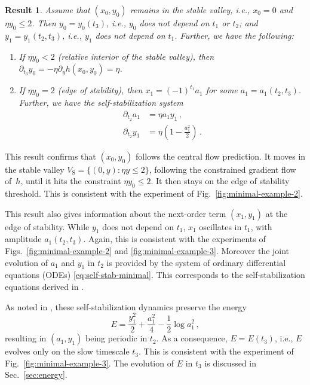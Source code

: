 \documentclass[11pt,english,reqno]{article}
\renewcommand{\leq}{\leqslant}
\theoremstyle{plain}
\newtheorem{result}[proposition]{Result}
\theoremstyle{definition}
\theoremstyle{remark}
\numberwithin{equation}{section}
\begin{document}
\begin{result}
    \label{result:minimal}
Assume that $(x_0, y_0)$ remains in the stable valley, i.e., $x_0 = 0$ and $\eta y_0 \leq 2$. Then $y_0 = y_0(t_3)$, i.e., $y_0$ does not depend on $t_1$ or $t_2$; and $y_1 = y_1(t_2, t_3)$, i.e., $y_1$ does not depend on $t_1$. Further, we have the following:
\begin{enumerate}[label=(\roman*)]
    \item\label{it:interior} If $\eta y_0 <2$ (relative interior of the stable valley), then $\partial_{t_3} y_0 = - \eta \partial_y h(x_0, y_0) = \eta$. 
    \item\label{it:eos} If $\eta y_0 = 2$ (edge of stability), then $x_1 = (-1)^{t_1}a_1$ for some $a_1 = a_1(t_2, t_3)$. Further, we have the self-stabilization system 
    \begin{equation}
        \label{eq:self-stab-minimal}
        \begin{split}
            \partial_{t_2} a_1 &= \eta a_1 y_1 \, , \\
            \partial_{t_2} y_1 &= \eta \left(1 - \frac{a_1^2}{2} \right) \, . 
        \end{split}
    \end{equation}
\end{enumerate}
\end{result}
This result confirms that $(x_0, y_0)$ follows the central flow prediction. It moves in the stable valley $V_{\mathrm{S}} = \{(0, y) : \eta y \leq 2\}$, following the constrained gradient flow of~$h$, until it hits the constraint $\eta y_0 \leq 2$. It then stays on the edge of stability threshold. This is consistent with the experiment of Fig.~\ref{fig:minimal-example-2}.

This result also gives information about the next-order term $(x_1, y_1)$ at the edge of stability. While $y_1$ does not depend on $t_1$, $x_1$ oscillates in $t_1$, with amplitude $a_1(t_2, t_3)$. Again, this is consistent with the experiments of Figs.~\ref{fig:minimal-example-2} and \ref{fig:minimal-example-3}. Moreover the joint evolution of $a_1$ and $y_1$ in $t_2$ is provided by the system of ordinary differential equations (ODEs) \eqref{eq:self-stab-minimal}. This corresponds to the self-stabilization equations derived in \cite{damian2022self}. 

As noted in \cite{damian2022self}, these self-stabilization dynamics preserve the energy 
\begin{equation*}
    E = \frac{y_1^2}{2} + \frac{a_1^2}{4} - \frac{1}{2} \log a_1^2 \, , 
\end{equation*}
resulting in $(a_1, y_1)$ being periodic in $t_2$. As a consequence, $E = E(t_3)$, i.e., $E$ evolves only on the slow timescale $t_3$. This is consistent with the experiment of Fig.~\ref{fig:minimal-example-3}. The evolution of $E$ in $t_3$ is discussed in Sec.~\ref{sec:energy}. 
\end{document}
